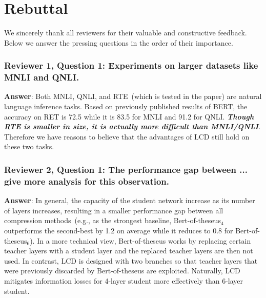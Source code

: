 \documentclass{article}
\begin{document}
\noindent{}
\section*{Rebuttal}
We sincerely thank all reviewers for their valuable and constructive feedback. Below we answer the pressing questions in the order of their importance. 
\subsubsection*{Reviewer 1, Question 1: Experiments on larger datasets like MNLI and QNLI.}
\textbf{Answer}: Both MNLI, QNLI, and RTE~(which is tested in the paper) are natural language inference tasks. Based on previously published results of BERT, the accuracy on RET is 72.5 while it is 83.5 for MNLI and 91.2 for QNLI. \textit{\textbf{Though RTE is smaller in size, it is actually more difficult than MNLI/QNLI}}. Therefore we have reasons to believe that the advantages of LCD still hold on these two tasks. 


\subsubsection*{Reviewer 2, Question 1: The performance gap between ... give more analysis for this observation.} 
\textbf{Answer}: In general, the capacity of the student network increase as its number of layers increases, resulting in a smaller performance gap between all compression methods~(e.g., as the strongest baseline, Bert-of-theseus$_4$ outperforms the second-best by 1.2 on average while it reduces to 0.8 for Bert-of-theseus$_6$).
In a more technical view, Bert-of-theseus works by replacing certain teacher layers with a student layer and the replaced teacher layers are then not used. In contrast, LCD is designed with two branches so that
teacher layers that were previously discarded by Bert-of-theseus are exploited. Naturally, LCD mitigates information losses for 4-layer student more effectively than 6-layer student.  
\end{document}
